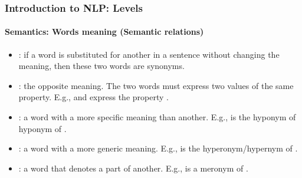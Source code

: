 \documentclass[xcolor=table]{beamer}
\begin{document}
\begin{frame}
\frametitle{Introduction to NLP: Levels}
\framesubtitle{Semantics: Words meaning (Semantic relations)}

\begin{itemize}
	\item {}: if a word is substituted for another in a sentence without changing the meaning, then these two words are synonyms.
	\item {}: the opposite meaning. The two words must express two values of the same property. E.g.,  and  express the property .
	
	\item {}: a word with a more specific meaning than another.
	E.g.,  is the hyponym of  hyponym of .
	 
	\item {}: a word with a more generic meaning.
	E.g.,  is the hyperonym/hypernym of .
	
	\item {}: a word that denotes a part of another.
	E.g.,  is a meronym of .
\end{itemize}

\end{frame}
\end{document}
